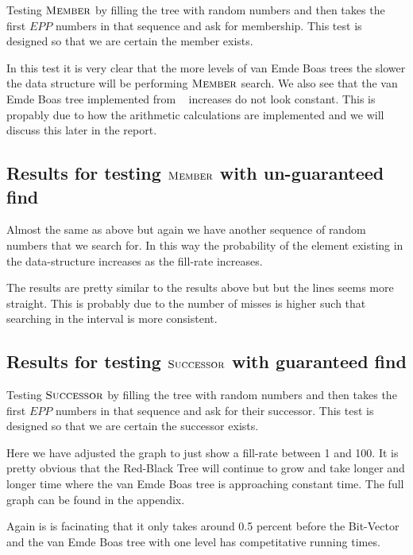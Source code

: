 \documentclass[oneside,11pt,openright]{report}
\newcommand{\Member}{\textsc{Member}}
\newcommand{\Successor}{\textsc{Successor}}
\begin{document}
Testing $\Member$ by filling the tree with random numbers and then takes the first $EPP$ numbers in that sequence and ask for membership. This test is designed so that we are certain the member exists.



In this test it is very clear that the more levels of van Emde Boas trees the slower the data structure will be performing $\Member$ search. We also see that the van Emde Boas tree implemented from ~\cite{ITA09} increases do not look constant. This is propably due to how the arithmetic calculations are implemented and we will discuss this later in the report.

\subsection{Results for testing $\Member$ with un-guaranteed find}

Almost the same as above but again we have another sequence of random numbers that we search for. In this way the probability of the element existing in the data-structure increases as the fill-rate increases.



The results are pretty similar to the results above but but the lines seems more straight. This is probably due to the number of misses is higher such that searching in the interval is more consistent.

\subsection{Results for testing $\Successor$ with guaranteed find}

Testing $\Successor$ by filling the tree with random numbers and then takes the first $EPP$ numbers in that sequence and ask for their successor. This test is designed so that we are certain the successor exists.



Here we have adjusted the graph to just show a fill-rate between 1 and 100. It is pretty obvious that the Red-Black Tree will continue to grow and take longer and longer time where the van Emde Boas tree is approaching constant time. The full graph can be found in the appendix.

Again is is facinating that it only takes around 0.5 percent before the Bit-Vector and the van Emde Boas tree with one level has competitative running times.
\end{document}
